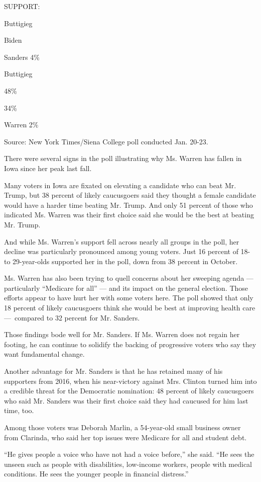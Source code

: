 SUPPORT:

Buttigieg

Biden

Sanders 4\%

Buttigieg

48\%

34\%

Warren 2\%

Source: New York Times/Siena College poll conducted Jan. 20-23.

There were several signs in the poll illustrating why Ms. Warren has
fallen in Iowa since her peak last fall.

Many voters in Iowa are fixated on elevating a candidate who can beat
Mr. Trump, but 38 percent of likely caucusgoers said they thought a
female candidate would have a harder time beating Mr. Trump. And only 51
percent of those who indicated Ms. Warren was their first choice said
she would be the best at beating Mr. Trump.

And while Ms. Warren's support fell across nearly all groups in the
poll, her decline was particularly pronounced among young voters. Just
16 percent of 18- to 29-year-olds supported her in the poll, down from
38 percent in October.

Ms. Warren has also been trying to quell concerns about her sweeping
agenda --- particularly ``Medicare for all'' --- and its impact on the
general election. Those efforts appear to have hurt her with some voters
here. The poll showed that only 18 percent of likely caucusgoers think
she would be best at improving health care ---~compared to 32 percent
for Mr. Sanders.

Those findings bode well for Mr. Sanders. If Ms. Warren does not regain
her footing, he can continue to solidify the backing of progressive
voters who say they want fundamental change.

Another advantage for Mr. Sanders is that he has retained many of his
supporters from 2016, when his near-victory against Mrs. Clinton turned
him into a credible threat for the Democratic nomination: 48 percent of
likely caucusgoers who said Mr. Sanders was their first choice said they
had caucused for him last time, too.

Among those voters was Deborah Marlin, a 54-year-old small business
owner from Clarinda, who said her top issues were Medicare for all and
student debt.

``He gives people a voice who have not had a voice before,'' she said.
``He sees the unseen such as people with disabilities, low-income
workers, people with medical conditions. He sees the younger people in
financial distress.''

